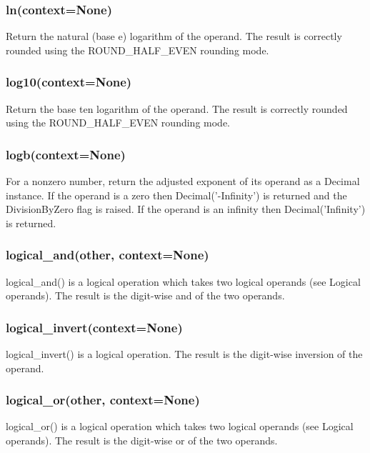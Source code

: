 \subsubsection{ln(context=None)}

Return the natural (base e) logarithm of the operand. The result is correctly rounded using the ROUND\_HALF\_EVEN rounding mode.

\subsubsection{log10(context=None)}

Return the base ten logarithm of the operand. The result is correctly rounded using the ROUND\_HALF\_EVEN rounding mode.

\subsubsection{logb(context=None)}

For a nonzero number, return the adjusted exponent of its operand as a Decimal instance. If the operand is a zero then Decimal('-Infinity') is returned and the DivisionByZero flag is raised. If the operand is an infinity then Decimal('Infinity') is returned.

\subsubsection{logical\_and(other, context=None)}

logical\_and() is a logical operation which takes two logical operands (see Logical operands). The result is the digit-wise and of the two operands.

\subsubsection{logical\_invert(context=None)}

logical\_invert() is a logical operation. The result is the digit-wise inversion of the operand.


\subsubsection{logical\_or(other, context=None)}

logical\_or() is a logical operation which takes two logical operands (see Logical operands). The result is the digit-wise or of the two operands.

